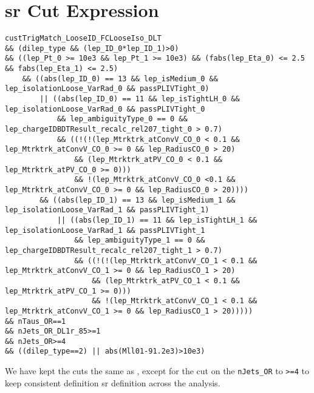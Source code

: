 \clearpage

\section[SR Cut Expression]{\acrshort{sr} Cut Expression}
\label{appendix:cut-expression}

{\fontsize{8}{10}\selectfont
    \begin{verbatim}
custTrigMatch_LooseID_FCLooseIso_DLT
&& (dilep_type && (lep_ID_0*lep_ID_1)>0)
&& ((lep_Pt_0 >= 10e3 && lep_Pt_1 >= 10e3) && (fabs(lep_Eta_0) <= 2.5 && fabs(lep_Eta_1) <= 2.5)
    && ((abs(lep_ID_0) == 13 && lep_isMedium_0 && lep_isolationLoose_VarRad_0 && passPLIVTight_0)
        || ((abs(lep_ID_0) == 11 && lep_isTightLH_0 && lep_isolationLoose_VarRad_0 && passPLIVTight_0
            && lep_ambiguityType_0 == 0 && lep_chargeIDBDTResult_recalc_rel207_tight_0 > 0.7)
            && ((!(!(lep_Mtrktrk_atConvV_CO_0 < 0.1 && lep_Mtrktrk_atConvV_CO_0 >= 0 && lep_RadiusCO_0 > 20)
                && (lep_Mtrktrk_atPV_CO_0 < 0.1 && lep_Mtrktrk_atPV_CO_0 >= 0)))
                && !(lep_Mtrktrk_atConvV_CO_0 <0.1 && lep_Mtrktrk_atConvV_CO_0 >= 0 && lep_RadiusCO_0 > 20))))
        && ((abs(lep_ID_1) == 13 && lep_isMedium_1 && lep_isolationLoose_VarRad_1 && passPLIVTight_1)
            || ((abs(lep_ID_1) == 11 && lep_isTightLH_1 && lep_isolationLoose_VarRad_1 && passPLIVTight_1
                && lep_ambiguityType_1 == 0 && lep_chargeIDBDTResult_recalc_rel207_tight_1 > 0.7)
                && ((!(!(lep_Mtrktrk_atConvV_CO_1 < 0.1 && lep_Mtrktrk_atConvV_CO_1 >= 0 && lep_RadiusCO_1 > 20)
                    && (lep_Mtrktrk_atPV_CO_1 < 0.1 && lep_Mtrktrk_atPV_CO_1 >= 0)))
                    && !(lep_Mtrktrk_atConvV_CO_1 < 0.1 && lep_Mtrktrk_atConvV_CO_1 >= 0 && lep_RadiusCO_1 > 20)))))
&& nTaus_OR==1
&& nJets_OR_DL1r_85>=1
&& nJets_OR>=4
&& ((dilep_type==2) || abs(Mll01-91.2e3)>10e3)
\end{verbatim}
}

We have kept the cuts the same as \cite{severin}, except for the cut on the \verb|nJets_OR| to \verb|>=4| to keep
consistent definition \gls{sr} definition across the \tth \lss analysis.